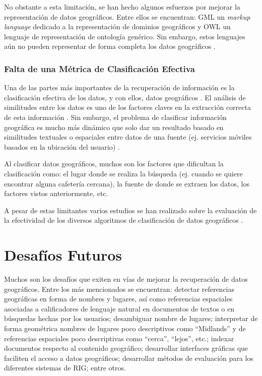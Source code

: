 \documentclass{llncs}
\begin{document}
No obstante a esta limitación, se han hecho algunos esfuerzos por mejorar la
representación de datos geográficos. Entre ellos se encuentran: GML un
\emph{markup language} dedicado a la representación de dominios geográficos y
OWL un lenguaje de representación de ontología genérico. Sin embargo, estos
lenguajes aún no pueden representar de forma completa los datos geográficos
\cite{abdelmoty2005}.

\subsubsection{Falta de una Métrica de Clasificación Efectiva}\label{sec:metric}

Una de las partes más importantes de la recuperación de información es la
clasificación efectiva de los datos, y con ellos, datos geográficos
\cite{purves2004,mandl2008,cai2011}. El análisis de similitudes entre los datos
es uno de los factores claves en la extracción correcta de esta información
\cite{janowicz2011}. Sin embargo, el problema de clasificar información
geográfica es mucho más dinámico que solo dar un resultado basado en
similitudes textuales o espaciales entre datos de una fuente (ej. servicios
móviles basados en la ubicación del usuario) \cite{kumar2011}.

Al clasificar datos geográficos, muchos son los factores que dificultan la
clasificación como: el lugar donde se realiza la búsqueda (ej. cuando se quiere
encontrar alguna cafetería cercana), la fuente de donde se extraen los datos,
los factores vistos anteriormente, etc.

A pesar de estas limitantes varios estudios se han realizado sobre la evaluación
de la efectividad de los diversos algoritmos de clasificación de datos geográficos
 \cite{larson2004jul,larson2004sep}.

\newpage

\section{Desafíos Futuros}\label{sec:chall}

Muchos son los desafíos que exiten en vías de mejorar la recuperación de datos
geográficos. Entre los más mencionados \cite{purves2014} se encuentran:
detectar referencias geográficas en forma de nombres y lugares, así como
referencias espaciales asociadas a calificadores de lenguaje natural en
documentos de textos o en búsquedas hechas por los usuarios; desambiguar nombre
de lugares; interpretar de forma geométrica nombres de lugares poco
descriptivos como ``Midlands'' y de referencias espaciales poco descriptivas
como ``cerca'', ``lejos'', etc.; indexar documentos respecto al contenido
geográfico; desarrollar interfaces gráficas que faciliten el acceso a datos
geográficos; desarrollar métodos de evaluación para los diferentes sistemas de
RIG; entre otros.
\end{document}
